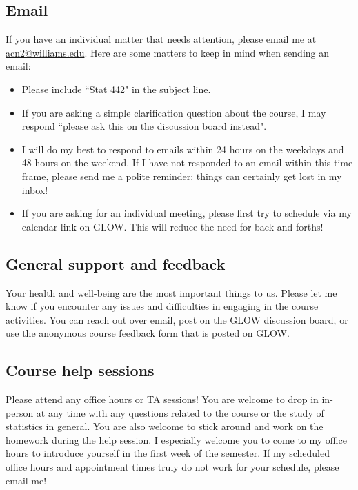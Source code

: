 \documentclass[11pt]{article}
\begin{document}
\subsection{Email}

If you have an individual matter that needs attention, please email me at \url{acn2@williams.edu}. Here are some matters to keep in mind when sending an email:
\begin{itemize}
\item Please include ``Stat 442" in the subject line. 
\item If you are asking a simple clarification question about the course, I may respond ``please ask this on the discussion board instead". 
\item I will do my best to respond to emails within 24 hours on the weekdays and 48 hours on the weekend. If I have not responded to an email within this time frame, please send me a polite reminder: things can certainly get lost in my inbox! 
\item If you are asking for an individual meeting, please first try to schedule via my calendar-link on GLOW. This will reduce the need for back-and-forths! 
\end{itemize}

\subsection{General support and feedback}

Your health and well-being are the most important things to us. Please let me know if you encounter any issues and difficulties in engaging in the course activities. You can reach out over email, post on the GLOW discussion board, or use the anonymous course feedback form that is posted on GLOW. 

\subsection{Course help sessions}

Please attend any office hours or TA sessions! You are welcome to drop in in-person at any time with any questions related to the course or the study of statistics in general. You are also welcome to stick around and work on the homework during the help session. I especially welcome you to come to my office hours to introduce yourself in the first week of the semester. If my scheduled office hours and appointment times truly do not work for your schedule, please email me! 
\end{document}
